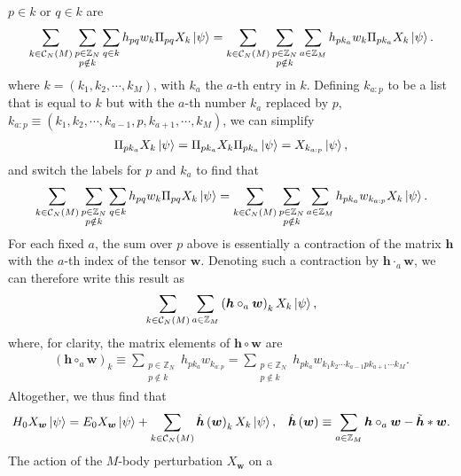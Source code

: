\documentclass[nofootinbib,notitlepage,11pt]{revtex4-2}
\newcommand{\p}[1]{\left(#1\right)} %
\renewcommand{\c}{\cdot} %
\newcommand{\m}{\bm} %
\newcommand{\1}{\mathds{1}}
\newcommand{\C}{\mathcal{C}}
\newcommand{\ZZ}{\mathbb{Z}}
\begin{document}
$p\in k$ or $q\in k$ are
\begin{align}
  \sum_{k\in\C_N\p{M}} \sum_{\substack{p\in\ZZ_N\\p\notin k}} \sum_{q\in k}
  h_{pq} w_k \Pi_{pq} X_k \ket\psi
  = \sum_{k\in\C_N\p{M}} \sum_{\substack{p\in\ZZ_N\\p\notin k}}
  \sum_{a\in\ZZ_M} h_{p k_a} w_k \Pi_{p k_a} X_k \ket\psi.
\end{align}
where $k=\p{k_1,k_2,\cdots,k_M}$, with $k_a$ the $a$-th entry in $k$.
Defining $k_{a:p}$ to be a list that is equal to $k$ but with the
$a$-th number $k_a$ replaced by $p$,
$k_{a:p}\equiv\p{k_1,k_2,\cdots,k_{a-1},p,k_{a+1},\cdots,k_M}$, we can
simplify
\begin{align}
  \Pi_{p k_a} X_k \ket\psi
  = \Pi_{p k_a} X_k \Pi_{p k_a} \ket\psi
  = X_{k_{a:p}}\ket\psi,
\end{align}
and switch the labels for $p$ and $k_a$ to find that
\begin{align}
  \sum_{k\in\C_N\p{M}} \sum_{\substack{p\in\ZZ_N\\p\notin k}}
  \sum_{q\in k} h_{pq} w_k  \Pi_{pq} X_k \ket\psi
  = \sum_{k\in\C_N\p{M}} \sum_{\substack{p\in\ZZ_N\\p\notin k}}
  \sum_{a\in\ZZ_M} h_{pk_a} w_{k_{a:p}} X_k \ket\psi.
\end{align}
For each fixed $a$, the sum over $p$ above is essentially a
contraction of the matrix $\m h$ with the $a$-th index of the tensor
$\m w$.  Denoting such a contraction by $\m h\c_a\m w$, we can
therefore write this result as
\begin{align}
  \sum_{k\in\C_N\p{M}} \sum_{a\in\ZZ_M}
  \p{\m h \circ_a \m w}_k X_k \ket\psi,
\end{align}
where, for clarity, the matrix elements of $\m h\circ\m w$ are
\begin{align}
  \p{\m h \circ_a \m w}_k
  \equiv \sum_{\substack{p\in\ZZ_N\\p\notin k}} h_{pk_a} w_{k_{a:p}}
  = \sum_{\substack{p\in\ZZ_N\\p\notin k}}
  h_{pk_a} w_{k_1 k_2 \cdots k_{a-1} p k_{a+1} \cdots k_M}.
\end{align}
Altogether, we thus find that
\begin{align}
  H_0 X_{\m w} \ket\psi
  = E_0 X_{\m w} \ket\psi + \sum_{k\in\C_N\p{M}}
  \hat{\m h}\p{\m w}_k X_k \ket\psi,
  &&
  \hat{\m h}\p{\m w}
  \equiv \sum_{a\in\ZZ_M} \m h \circ_a \m w - \tilde{\m h} * \m w.
  \label{eq:diagnosis_end}
\end{align}
The action of the $M$-body perturbation $X_{\m w}$ on a
\end{document}
